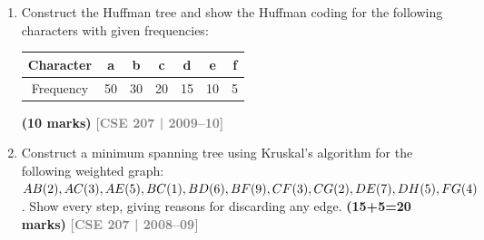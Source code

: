 \documentclass[12pt,a3paper]{article}
\newcommand{\yr}[1]{\hfill\textcolor{gray}{\small\textbf{[#1]}}}
\newcommand{\mk}[1]{\textcolor{orange!70!black}{\small\textbf{(#1 marks)}}}
\begin{document}
\begin{enumerate}
\gdef\drawKruskalFaintEdges{
  \draw[grayedge] (a) -- node[graylbl, above right] {2}  (b);
  \draw[grayedge] (b) -- node[graylbl, right]       {3}  (c);
  \draw[grayedge] (c) -- node[graylbl, below right] {4}  (d);
  \draw[grayedge] (d) -- node[graylbl, below]       {1}  (e);
  \draw[grayedge] (e) -- node[graylbl, below left]  {7}  (f);
  \draw[grayedge] (f) -- node[graylbl, left]        {10} (g);
  \draw[grayedge] (g) -- node[graylbl, above left]  {11} (a);
  \draw[grayedge] (a) -- node[graylbl, right, pos=0.7] {5}  (c);
  \draw[grayedge] (a) -- node[graylbl, right, pos=0.8] {6}  (d);
  \draw[grayedge] (a) -- node[graylbl, left, pos=0.8]  {8}  (f);
  \draw[grayedge] (a) -- node[graylbl, left, pos=0.7]  {9}  (e);
}

\item Construct the Huffman tree and show the Huffman coding for the following characters with given frequencies:
\begin{center}
\begin{tabular}{ccccccc}
\toprule
Character & a & b & c & d & e & f \\
\midrule
Frequency & 50 & 30 & 20 & 15 & 10 & 5 \\
\bottomrule
\end{tabular}
\end{center}
\mk{10}
\yr{CSE 207 | 2009--10}

\item Construct a minimum spanning tree using Kruskal's algorithm for the following weighted graph: $AB(2), AC(3), AE(5), BC(1), BD(6), BF(9), CF(3), CG(2), DE(7),\\ DH(5), FG(4)$. Show every step, giving reasons for discarding any edge. \mk{15+5=20}
\yr{CSE 207 | 2008--09}



\end{enumerate}
\end{document}
